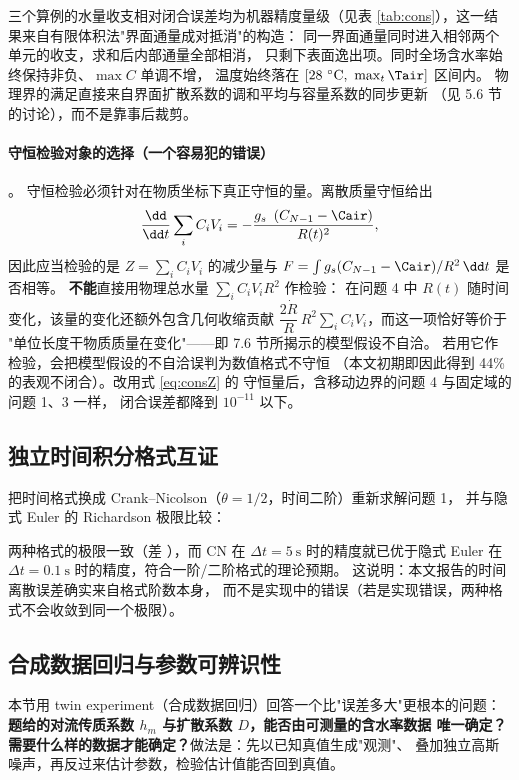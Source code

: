 三个算例的水量收支相对闭合误差均为机器精度量级（见表
\ref{tab:cons}），这一结果来自有限体积法"界面通量成对抵消"的构造：
同一界面通量同时进入相邻两个单元的收支，求和后内部通量全部相消，
只剩下表面逸出项。同时全场含水率始终保持非负、$\max C$ 单调不增，
温度始终落在 $[28\ ^\circ\mathrm{C},\ \max_t\Tair]$ 区间内。
物理界的满足直接来自界面扩散系数的调和平均与容量系数的同步更新
（见 5.6 节的讨论），而不是靠事后裁剪。

\paragraph{守恒检验对象的选择（一个容易犯的错误）}。
守恒检验必须针对在物质坐标下真正守恒的量。离散质量守恒给出
\begin{equation}
\frac{\dd}{\dd t}\sum_i C_iV_i
=-\frac{g_s\ \left(C_{N-1}-\Cair\right)}{R(t)^2},
\label{eq:consZ}
\end{equation}
因此应当检验的是 $Z=\sum_i C_iV_i$ 的减少量与
$F=\int g_s(C_{N-1}-\Cair)/R^2\,\dd t$ 是否相等。
\textbf{不能}直接用物理总水量 $\sum_iC_iV_iR^2$ 作检验：
在问题 4 中 $R(t)$ 随时间变化，该量的变化还额外包含几何收缩贡献
$\dfrac{2\dot R}{R}\,R^2\sum_iC_iV_i$，而这一项恰好等价于
"单位长度干物质质量在变化"——即 7.6 节所揭示的模型假设不自洽。
若用它作检验，会把模型假设的不自洽误判为数值格式不守恒
（本文初期即因此得到 44\% 的表观不闭合）。改用式 \eqref{eq:consZ} 的
守恒量后，含移动边界的问题 4 与固定域的问题 1、3 一样，
闭合误差都降到 $10^{-11}$ 以下。

\subsection{独立时间积分格式互证}

把时间格式换成 Crank--Nicolson（$\theta=1/2$，时间二阶）重新求解问题 1，
并与隐式 Euler 的 Richardson 极限比较：



两种格式的极限一致（差 ），而 CN 在
$\Delta t=5\ \mathrm{s}$ 时的精度就已优于隐式 Euler 在
$\Delta t=0.1\ \mathrm{s}$ 时的精度，符合一阶/二阶格式的理论预期。
这说明：本文报告的时间离散误差确实来自格式阶数本身，
而不是实现中的错误（若是实现错误，两种格式不会收敛到同一个极限）。

\subsection{合成数据回归与参数可辨识性}

本节用 twin experiment（合成数据回归）回答一个比"误差多大"更根本的问题：
\textbf{题给的对流传质系数 $h_m$ 与扩散系数 $D$，能否由可测量的含水率数据
唯一确定？需要什么样的数据才能确定？}做法是：先以已知真值生成"观测"、
叠加独立高斯噪声，再反过来估计参数，检验估计值能否回到真值。

